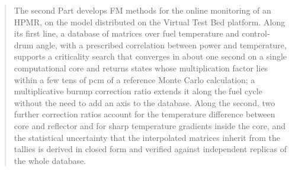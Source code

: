 \begin{abstract}
The second Part develops FM methods for the online monitoring of an HPMR, on
the model distributed on the Virtual Test Bed platform. Along its first line, a
database of matrices over fuel temperature and control-drum angle, with a
prescribed correlation between power and temperature, supports a criticality
search that converges in about one second on a single computational core and returns states
whose multiplication factor lies within a few tens of pcm of a reference Monte
Carlo calculation; a multiplicative burnup correction ratio extends it along
the fuel cycle without the need to add an axis to the database. Along the
second, two further correction
ratios account for the temperature difference between core and reflector and
for sharp temperature gradients inside the core, and the statistical
uncertainty that the interpolated matrices inherit from the tallies is derived
in closed form and verified against independent replicas of the whole
database.
\end{abstract}
